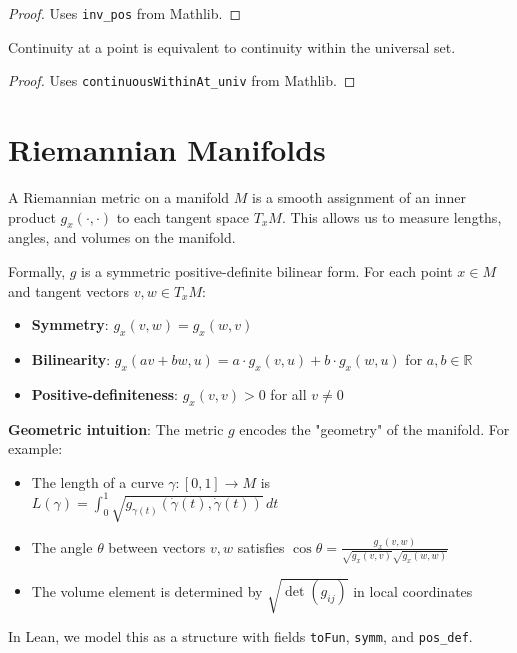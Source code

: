 \begin{proof}
\leanok
Uses \texttt{inv\_pos} from Mathlib.
\end{proof}

\begin{lemma}
\label{lem:continuousAt_iff}
\leanok
Continuity at a point is equivalent to continuity within the universal set.
\end{lemma}

\begin{proof}
\leanok
Uses \texttt{continuousWithinAt\_univ} from Mathlib.
\end{proof}

\chapter{Riemannian Manifolds}
\label{chap:riemannian}

\begin{definition}
\label{def:riemannian_metric}
\leanok
{}
A Riemannian metric on a manifold $M$ is a smooth assignment of an inner product $g_x(\cdot,\cdot)$ to each tangent space $T_xM$. This allows us to measure lengths, angles, and volumes on the manifold.

Formally, $g$ is a symmetric positive-definite bilinear form. For each point $x \in M$ and tangent vectors $v, w \in T_xM$:
\begin{itemize}
\item \textbf{Symmetry}: $g_x(v, w) = g_x(w, v)$
\item \textbf{Bilinearity}: $g_x(av + bw, u) = a \cdot g_x(v,u) + b \cdot g_x(w,u)$ for $a,b \in \mathbb{R}$
\item \textbf{Positive-definiteness}: $g_x(v, v) > 0$ for all $v \neq 0$
\end{itemize}

\textbf{Geometric intuition}: The metric $g$ encodes the "geometry" of the manifold. For example:
\begin{itemize}
\item The length of a curve $\gamma : [0,1] \to M$ is $L(\gamma) = \int_0^1 \sqrt{g_{\gamma(t)}(\dot{\gamma}(t), \dot{\gamma}(t))} \, dt$
\item The angle $\theta$ between vectors $v,w$ satisfies $\cos \theta = \frac{g_x(v,w)}{\sqrt{g_x(v,v)} \sqrt{g_x(w,w)}}$
\item The volume element is determined by $\sqrt{\det(g_{ij})}$ in local coordinates
\end{itemize}

In Lean, we model this as a structure with fields \texttt{toFun}, \texttt{symm}, and \texttt{pos\_def}.
\end{definition}

